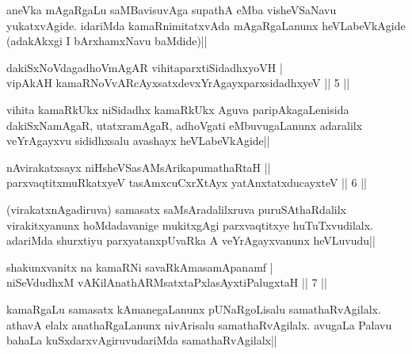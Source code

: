 \begin{artha}
aneVka mAgaRgaLu saMBavisuvAga supathA eMba visheVSaNavu yukatxvAgide. 
idariMda kamaRnimitatxvAda mAgaRgaLanunx heVLabeVkAgide (adakAkxgi I 
bArxhamxNavu baMdide)||
\end{artha}


\begin{shl}
dakiSxNoVdagadhoVmAgAR vihitaparxtiSidadhxyoVH | \\
vipAkAH kamaRNoVvARcAyxsatxdevxYrAgayxparxsidadhxyeV \hfill|| 5 || 
\end{shl}

\begin{artha}
vihita kamaRkUkx niSidadhx kamaRkUkx Aguva paripAkagaLenisida 
dakiSxNamAgaR, utatxramAgaR, adhoVgati eMbuvugaLanunx adaralilx 
veYrAgayxvu sididhxsalu avashayx heVLabeVkAgide||
\end{artha}


\begin{shl}
nAvirakatxsayx niHsheVSasAMsArikapumathaRtaH || \\
parxvaqtitxmuRkatxyeV tasAmxcuCxrXtAyx yatAnxtatxducayxteV \hfill|| 6 || 
\end{shl}

\begin{artha}
(virakatxnAgadiruva) samasatx saMsAradalilxruva puruSAthaRdalilx 
virakitxyanunx hoMdadavanige mukitxgAgi parxvaqtitxye huTuTxvudilalx. 
adariMda shurxtiyu parxyatanxpUvaRka A veYrAgayxvanunx heVLuvudu||
\end{artha}


\begin{shl}
shakunxvanitx na kamaRNi savaRkAmasamApanamf | \\
niSeVdudhxM vA\s KilAnathARMsatxtaPxlasAyxtiPalugxtaH \hfill|| 7 || 
\end{shl}

\begin{artha}
kamaRgaLu samasatx kAmanegaLanunx pUNaRgoLisalu samathaRvAgilalx. 
athavA elalx anathaRgaLanunx nivArisalu samathaRvAgilalx. avugaLa 
Palavu bahaLa kuSxdarxvAgiruvudariMda samathaRvAgilalx||
\end{artha}


